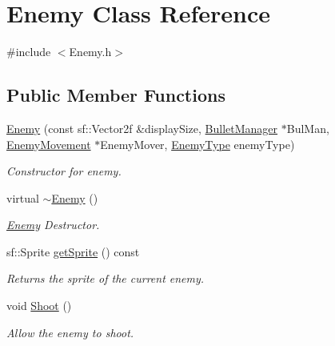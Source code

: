 \hypertarget{class_enemy}{}\section{Enemy Class Reference}
\label{class_enemy}


{\ttfamily \#include $<$Enemy.\+h$>$}

\subsection*{Public Member Functions}
\begin{DoxyCompactItemize}
\item 
\hyperlink{class_enemy_aad76aec6e71a26cff30fd4bb1d5323d2}{Enemy} (const sf\+::\+Vector2f \&display\+Size, \hyperlink{class_bullet_manager}{Bullet\+Manager} $\ast$Bul\+Man, \hyperlink{class_enemy_movement}{Enemy\+Movement} $\ast$Enemy\+Mover, \hyperlink{_enemy_8h_ac3e413a86119db4b031458c7259e268e}{Enemy\+Type} enemy\+Type)
\begin{DoxyCompactList}\small\item\em Constructor for enemy. \end{DoxyCompactList}\item 
\mbox{\label{class_enemy_ac0eec4755e28c02688065f9657150ac3}} 
virtual \hyperlink{class_enemy_ac0eec4755e28c02688065f9657150ac3}{$\sim$\+Enemy} ()
\begin{DoxyCompactList}\small\item\em \hyperlink{class_enemy}{Enemy} Destructor. \end{DoxyCompactList}\item 
\mbox{\label{class_enemy_a8f769acc8f473846d11eaabf504a1089}} 
sf\+::\+Sprite \hyperlink{class_enemy_a8f769acc8f473846d11eaabf504a1089}{get\+Sprite} () const
\begin{DoxyCompactList}\small\item\em Returns the sprite of the current enemy. \end{DoxyCompactList}\item 
\mbox{\label{class_enemy_ab526cfaf13910e15ca1e5e84ef230dd1}} 
void \hyperlink{class_enemy_ab526cfaf13910e15ca1e5e84ef230dd1}{Shoot} ()
\begin{DoxyCompactList}\small\item\em Allow the enemy to shoot. \end{DoxyCompactList}\item 

\end{DoxyCompactItemize}
